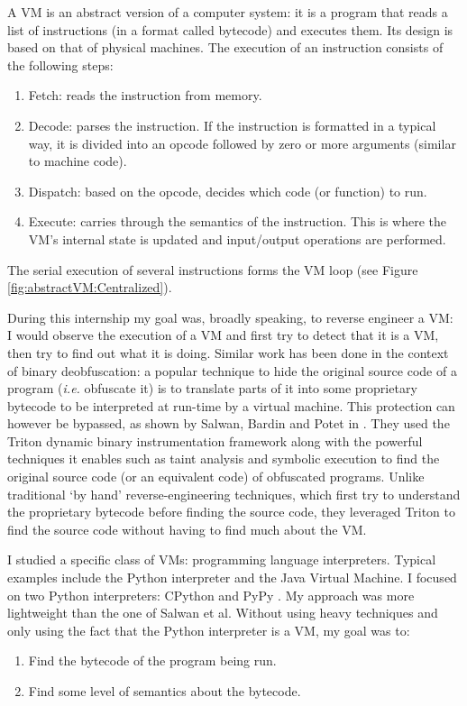 \documentclass[english]{article}
\begin{document}
A VM is an abstract version of a computer system: it is a program that reads a list of instructions (in a format called bytecode) and executes them. Its design is based on that of physical machines. The execution of an instruction consists of the following steps:
\begin{enumerate}
	\item Fetch: reads the instruction from memory.
	\item Decode: parses the instruction. If the instruction is formatted in a typical way, it is divided into an opcode followed by zero or more arguments (similar to machine code).
	\item Dispatch: based on the opcode, decides which code (or function) to run.
	\item Execute: carries through the semantics of the instruction. This is where the VM's internal state is updated and input/output operations are performed.
\end{enumerate}
The serial execution of several instructions forms the VM loop (see Figure \ref{fig:abstractVM:Centralized}).

During this internship my goal was, broadly speaking, to reverse engineer a VM: I would observe the execution of a VM and first try to detect that it is a VM, then try to find out what it is doing. Similar work has been done in the context of binary deobfuscation: a popular technique to hide the original source code of a program (\textit{i.e.} obfuscate it) is to translate parts of it into some proprietary bytecode to be interpreted at run-time by a virtual machine. This protection can however be bypassed, as shown by Salwan, Bardin and Potet in \cite{tritondeobfs}. They used the Triton dynamic binary instrumentation framework along with the powerful techniques it enables such as taint analysis and symbolic execution to find the original source code (or an equivalent code) of obfuscated programs. Unlike traditional `by hand' reverse-engineering techniques, which first try to understand the proprietary bytecode before finding the source code, they leveraged Triton to find the source code without having to find much about the VM. 

I studied a specific class of VMs: programming language interpreters. Typical examples include the Python interpreter and the Java Virtual Machine. I focused on two Python interpreters: CPython \cite{cpython} and PyPy \cite{pypy}. My approach was more lightweight than the one of Salwan et al. Without using heavy techniques and only using the fact that the Python interpreter is a VM, my goal was to:
\begin{enumerate}
	\item Find the bytecode of the program being run.
	\item Find some level of semantics about the bytecode.
\end{enumerate}
\end{document}
